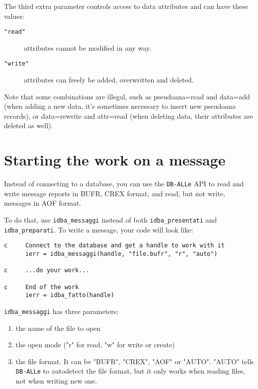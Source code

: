 \documentclass[final,12pt,a4paper,twoside]{book}
\newcommand{\dballe}{{\tt DB-ALLe}}
\begin{document}
The third extra parameter controls access to data attributes and can have
these values:

\begin{description}
\item[{\tt "read"}] attributes cannot be modified in any way.
\item[{\tt "write"}] attributes can freely be added, overwritten and deleted.
\end{description}

Note that some combinations are illegal, such as pseudoana=read and data=add
(when adding a new data, it's sometimes necessary to insert new pseudoana
records), or data=rewrite and attr=read (when deleting data, their attributes
are deleted as well).

\section{Starting the work on a message}

Instead of connecting to a database, you can use the \dballe{} API to read and
write message reports in BUFR, CREX format, and read, but not write, messages
in AOF format.

To do that, use {\tt idba\_messaggi} instead of both {\tt idba\_presentati} and
{\tt idba\_preparati}.  To write a message, your code will look like:

\begin{verbatim}
c     Connect to the database and get a handle to work with it
      ierr = idba_messaggi(handle, "file.bufr", "r", "auto")

c     ...do your work...

c     End of the work
      ierr = idba_fatto(handle)
\end{verbatim}

\label{fun-idba_messaggi}

{\tt idba\_messaggi} has three parameters:

\begin{enumerate}
\item the name of the file to open
\item the open mode ("r" for read, "w" for write or create)
\item the file format.  It can be "BUFR", "CREX", "AOF" or "AUTO".  "AUTO"
      tells \dballe{} to autodetect the file format, but it only works when
      reading files, not when writing new one.
\end{enumerate}
\end{document}

